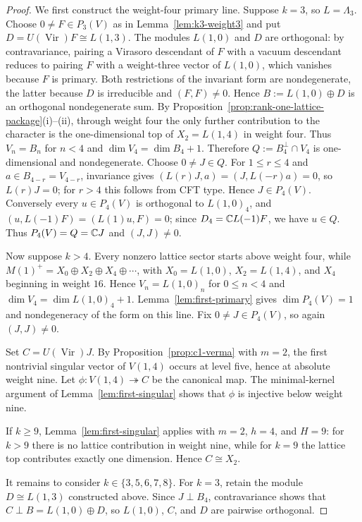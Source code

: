 \documentclass[10pt,a4paper]{amsart}
\numberwithin{equation}{section} \newtheorem{thm}{Theorem}[section] \newtheorem{lem}[thm]{Lemma} \newtheorem{ex}[thm]{Example} \newtheorem{prop}[thm]{Proposition} \newtheorem{cor}[thm]{Corollary} \newtheorem{defi}[thm]{Definition} \newtheorem{rmk}[thm]{Remark} \newtheorem{notation}[thm]{Notation}
\newcommand{\Vir}{\operatorname{Vir}}
\begin{document}
\begin{proof}
We first construct the weight-four primary line. Suppose $k=3$, so $L=\Lambda_3$. Choose $0\ne F\in P_3(V)$ as in Lemma~\ref{lem:k3-weight3} and put $D=U(\Vir)F\cong L(1,3)$. The modules $L(1,0)$ and $D$ are orthogonal: by contravariance, pairing a Virasoro descendant of $F$ with a vacuum descendant reduces to pairing $F$ with a weight-three vector of $L(1,0)$, which vanishes because $F$ is primary. Both restrictions of the invariant form are nondegenerate, the latter because $D$ is irreducible and $(F,F)\ne0$. Hence $B:=L(1,0)\oplus D$ is an orthogonal nondegenerate sum. By Proposition~\ref{prop:rank-one-lattice-package}(i)--(ii), through weight four the only further contribution to the character is the one-dimensional top of $X_2=L(1,4)$ in weight four. Thus $V_n=B_n$ for $n<4$ and $\dim V_4=\dim B_4+1$. Therefore $Q:=B_4^\perp\cap V_4$ is one-dimensional and nondegenerate. Choose $0\ne J\in Q$. For $1\le r\le4$ and $a\in B_{4-r}=V_{4-r}$, invariance gives \((L(r)J,a)=(J,L(-r)a)=0\), so $L(r)J=0$; for $r>4$ this follows from CFT type. Hence $J\in P_4(V)$. Conversely every $u\in P_4(V)$ is orthogonal to $L(1,0)_4$, and \((u,L(-1)F)=(L(1)u,F)=0\); since $D_4=\mathbb{C} L(-1)F$, we have $u\in Q$. Thus $P_4(V)=Q=\mathbb{C} J$ and $(J,J)\ne0$.

Now suppose $k>4$. Every nonzero lattice sector starts above weight four, while \(M(1)^+=X_0\oplus X_2\oplus X_4\oplus\cdots\), with $X_0=L(1,0)$, $X_2=L(1,4)$, and $X_4$ beginning in weight $16$. Hence $V_n=L(1,0)_n$ for $0\le n<4$ and $\dim V_4=\dim L(1,0)_4+1$. Lemma~\ref{lem:first-primary} gives $\dim P_4(V)=1$ and nondegeneracy of the form on this line. Fix $0\ne J\in P_4(V)$, so again $(J,J)\ne0$.

Set $C=U(\Vir)J$. By Proposition~\ref{prop:c1-verma} with $m=2$, the first nontrivial singular vector of $V(1,4)$ occurs at level five, hence at absolute weight nine. Let \(\phi:V(1,4)\twoheadrightarrow C\) be the canonical map. The minimal-kernel argument of Lemma~\ref{lem:first-singular} shows that $\phi$ is injective below weight nine.

If $k\ge9$, Lemma~\ref{lem:first-singular} applies with $m=2$, $h=4$, and $H=9$: for $k>9$ there is no lattice contribution in weight nine, while for $k=9$ the lattice top contributes exactly one dimension. Hence $C\cong X_2$.

It remains to consider $k\in\{3,5,6,7,8\}$. For $k=3$, retain the module $D\cong L(1,3)$ constructed above. Since $J\perp B_4$, contravariance shows that $C\perp B=L(1,0)\oplus D$, so $L(1,0)$, $C$, and $D$ are pairwise orthogonal.


\end{proof}
\end{document}
